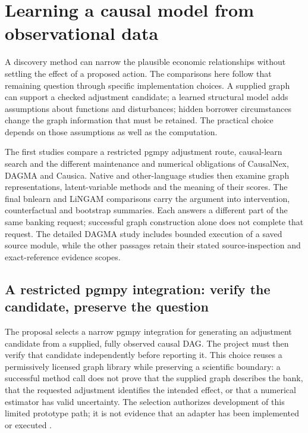 \chapter{Learning a causal model from observational data}
A discovery method can narrow the plausible economic relationships without
settling the effect of a proposed action. The comparisons here follow that
remaining question through specific implementation choices. A supplied graph
can support a checked adjustment candidate; a learned structural model adds
assumptions about functions and disturbances; hidden borrower circumstances
change the graph information that must be retained. The practical choice
depends on those assumptions as well as the computation.

The first studies compare a restricted pgmpy adjustment route, causal-learn
search and the different maintenance and numerical obligations of CausalNex,
DAGMA and Causica. Native and other-language studies then examine graph
representations, latent-variable methods and the meaning of their scores.
The final bnlearn and LiNGAM comparisons carry the argument into intervention,
counterfactual and bootstrap summaries. Each answers a different part of the
same banking request; successful graph construction alone does not complete
that request. The detailed DAGMA study includes bounded execution of a saved
source module, while the other passages retain their stated source-inspection
and exact-reference evidence scopes.



\section{A restricted pgmpy integration: verify the candidate, preserve the question}
\label{exec13:pgmpy-reuse}

The proposal selects a narrow pgmpy integration for generating an adjustment
candidate from a supplied, fully observed causal DAG. The project must then
verify that candidate independently before reporting it. This choice reuses
a permissively licensed graph library while preserving a scientific boundary:
a successful method call does not prove that the supplied graph describes
the bank, that the requested adjustment identifies the intended effect, or
that a numerical estimator has valid uncertainty. The selection authorizes
development of this limited prototype path; it is not evidence that an
adapter has been implemented or executed
\citep{exec13_pgmpy_reuse_primary,exec13_pgmpy_reuse_oracle}.

